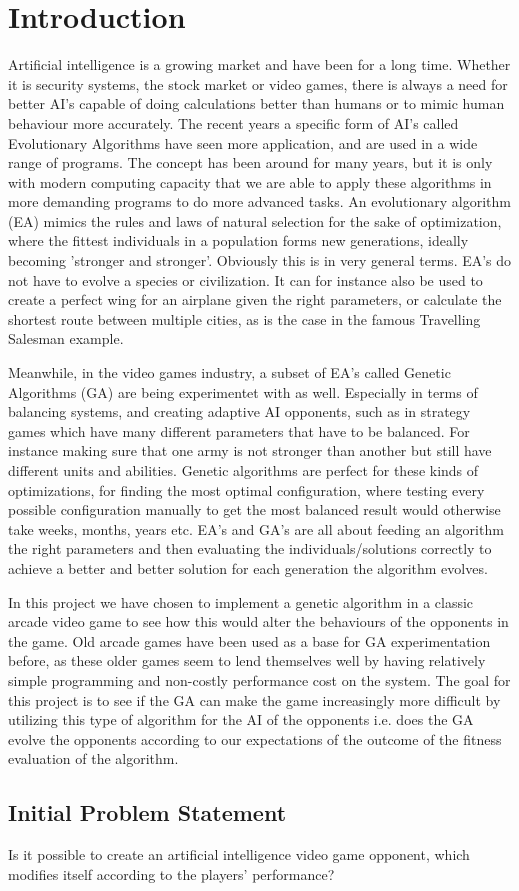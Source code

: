\section{Introduction} \label{sec:introduction}
Artificial intelligence is a growing market and have been for a long time. Whether it is security systems, the stock market or video games, there is always a need for better AI's capable of doing calculations better than humans or to mimic human behaviour more accurately. The recent years a specific form of AI's called Evolutionary Algorithms have seen more application, and are used in a wide range of programs. The concept has been around for many years, but it is only with modern computing capacity that we are able to apply these algorithms in more demanding programs to do more advanced tasks. An evolutionary algorithm (EA) mimics the rules and laws of natural selection for the sake of optimization, where the fittest individuals in a population forms new generations, ideally becoming 'stronger and stronger'. Obviously this is in very general terms. EA's do not have to evolve a species or civilization. It can for instance also be used to create a perfect wing for an airplane given the right parameters, or calculate the shortest route between multiple cities, as is the case in the famous Travelling Salesman example.

Meanwhile, in the video games industry, a subset of EA's called Genetic Algorithms (GA) are being experimentet with as well. Especially in terms of balancing systems, and creating adaptive AI opponents, such as in strategy games which have many different parameters that have to be balanced. For instance making sure that one army is not stronger than another but still have different units and abilities. Genetic algorithms are perfect for these kinds of optimizations, for finding the most optimal configuration, where testing every possible configuration manually to get the most balanced result would otherwise take weeks, months, years etc. EA's and GA's are all about feeding an algorithm the right parameters and then evaluating the individuals/solutions correctly to achieve a better and better solution for each generation the algorithm evolves.

In this project we have chosen to implement a genetic algorithm in a classic arcade video game to see how this would alter the behaviours of the opponents in the game. Old arcade games have been used as a base for GA experimentation before, as these older games seem to lend themselves well by having relatively simple programming and non-costly performance cost on the system. The goal for this project is to see if the GA can make the game increasingly more difficult by utilizing this type of algorithm for the AI of the opponents i.e. does the GA evolve the opponents according to our expectations of the outcome of the fitness evaluation of the algorithm.



\subsection{Initial Problem Statement} \label{sec:initialproblemstatement}
Is it possible to create an artificial intelligence video game opponent, which modifies itself according to the players' performance?
